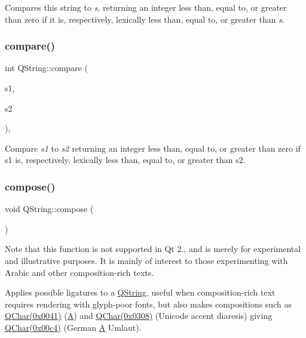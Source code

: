 Compares this string to {\itshape s}, returning an integer less than, equal to, or greater than zero if it is, respectively, lexically less than, equal to, or greater than {\itshape s}. \mbox{\label{class_q_string_ac8f4c4a5a71bab250e9021c6511269dd}} 
\subsubsection{\texorpdfstring{compare()}{compare()}\hspace{0.1cm}{\footnotesize\ttfamily [2/2]}}
{\footnotesize\ttfamily int Q\+String\+::compare (\begin{DoxyParamCaption}\item[{const \mbox{\hyperlink{class_q_string}{Q\+String}} \&}]{s1,  }\item[{const \mbox{\hyperlink{class_q_string}{Q\+String}} \&}]{s2 }\end{DoxyParamCaption})\hspace{0.3cm}{\ttfamily [inline]}, {\ttfamily [static]}}

Compare {\itshape s1} to {\itshape s2} returning an integer less than, equal to, or greater than zero if s1 is, respectively, lexically less than, equal to, or greater than s2. \mbox{\label{class_q_string_a1b04937a2233337016aafaa546ef83a9}} 
\subsubsection{\texorpdfstring{compose()}{compose()}}
{\footnotesize\ttfamily void Q\+String\+::compose (\begin{DoxyParamCaption}{ }\end{DoxyParamCaption})}

Note that this function is not supported in Qt 2., and is merely for experimental and illustrative purposes. It is mainly of interest to those experimenting with Arabic and other composition-\/rich texts.

Applies possible ligatures to a \mbox{\hyperlink{class_q_string}{Q\+String}}, useful when composition-\/rich text requires rendering with glyph-\/poor fonts, but also makes compositions such as \mbox{\hyperlink{class_q_char}{Q\+Char(0x0041)}} (\textquotesingle{}\mbox{\hyperlink{class_a}{A}}\textquotesingle{}) and \mbox{\hyperlink{class_q_char}{Q\+Char(0x0308)}} (Unicode accent diaresis) giving \mbox{\hyperlink{class_q_char}{Q\+Char(0x00c4)}} (German \mbox{\hyperlink{class_a}{A}} Umlaut). \mbox{\label{class_q_string_a4eb0e1874ad0605cfdaee56eda991ed1}} 
